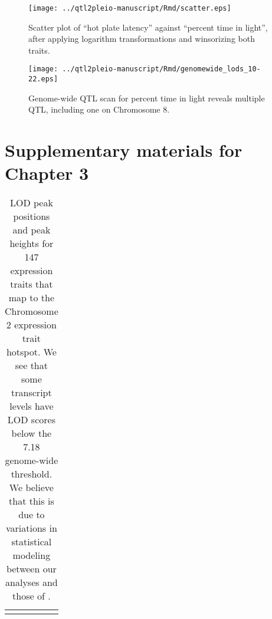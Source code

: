 \documentclass[oneside]{book}
\begin{document}
\begin{appendices}
\clearpage


\renewcommand{\thefigure}{\textbf{S\arabic{figure}}}
\setcounter{figure}{0}

\begin{figure}
\texttt{[image: ../qtl2pleio-manuscript/Rmd/scatter.eps]}
\caption{Scatter plot of ``hot plate latency'' against ``percent time in
  light'', after applying logarithm transformations and winsorizing
  both traits.}
\label{fig:scatter}
\end{figure}


\begin{figure}
\texttt{[image: ../qtl2pleio-manuscript/Rmd/genomewide\_lods\_10-22.eps]}
\caption{Genome-wide QTL scan for percent time in light reveals
  multiple QTL, including one on Chromosome 8.}
\label{fig:genomewide10-22}
\end{figure}

\chapter{Supplementary materials for Chapter 3}

{\tiny
\begin{longtable}{lrr}
\caption{LOD peak positions and peak heights for 147 expression traits that map to the Chromosome 2 expression trait hotspot. We see that some transcript levels have LOD scores below the 7.18 genome-wide threshold. We believe that this is due to variations in statistical modeling between our analyses and those of \citet{keller2018genetic}.}\\ 
\hline \\


\end{longtable}}
\end{appendices}
\end{document}
